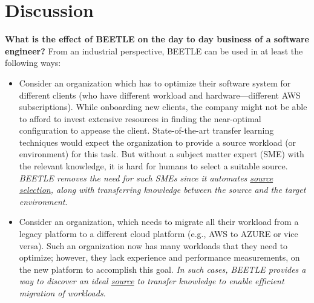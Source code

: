 \documentclass[10pt,journal,compsoc]{IEEEtran}
\begin{document}
    
\section{Discussion}
\label{sect:disc}

\noindent\textbf{What is the effect of BEETLE on the day to day business of a software engineer?}
From an industrial perspective, 
BEETLE can be used in at least the following ways:
\begin{itemize}[leftmargin=*]
\item
Consider an organization which has to optimize their software system for different clients (who have different workload and hardware---different AWS subscriptions). While onboarding new clients, the company might not be able to afford to invest extensive resources in finding the near-optimal configuration to appease the client. State-of-the-art transfer learning techniques would expect the organization to provide a source workload (or environment) for this task. But without a  subject matter expert (SME) with the relevant knowledge, it is hard for humans to select a suitable source. \textit{BEETLE removes the need for such SMEs since it automates \underline{source selection}, along with transferring knowledge between the source and the target environment}.
\item
Consider an organization, which needs to migrate all their workload from a legacy platform to a different cloud platform (e.g., AWS to AZURE or vice versa). Such an organization now has many workloads that they need to optimize; however, they lack experience and performance measurements, on the new platform to accomplish this goal. \textit{In such cases, BEETLE provides a way to discover an ideal \underline{source} to transfer knowledge to enable efficient migration of workloads}. 
\end{itemize}



\end{document}
